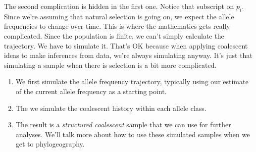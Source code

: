The second complication is hidden in the first one. Notice that
subscript on $p_t$. Since we're assuming that natural selection is
going on, we expect the allele frequencies to change over time. This
is where the mathematics gets really complicated. Since the population
is finite, we can't simply calculate the trajectory. We have to
simulate it. That's OK because when applying coalescent ideas to make
inferences from data, we're always simulating anyway. It's just that
simulating a sample when there is selection is a bit more complicated.

\begin{enumerate}

  \item We first simulate the allele frequency trajectory, typically
    using our estimate of the current allele frequency as a starting
    point.

  \item The we simulate the coalescent history within each allele
    class.

  \item The result is a {\it structured coalescent}  
    sample that we can use for further analyses. We'll talk more about
    how to use these simulated samples when we get to phylogeography.
    
  \end{enumerate}

